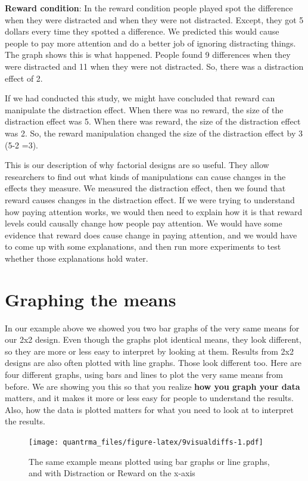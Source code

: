 \documentclass[
]{book}
\begin{document}
\textbf{Reward condition}: In the reward condition people played spot the difference when they were distracted and when they were not distracted. Except, they got 5 dollars every time they spotted a difference. We predicted this would cause people to pay more attention and do a better job of ignoring distracting things. The graph shows this is what happened. People found 9 differences when they were distracted and 11 when they were not distracted. So, there was a distraction effect of 2.

If we had conducted this study, we might have concluded that reward can manipulate the distraction effect. When there was no reward, the size of the distraction effect was 5. When there was reward, the size of the distraction effect was 2. So, the reward manipulation changed the size of the distraction effect by 3 (5-2 =3).

This is our description of why factorial designs are so useful. They allow researchers to find out what kinds of manipulations can cause changes in the effects they measure. We measured the distraction effect, then we found that reward causes changes in the distraction effect. If we were trying to understand how paying attention works, we would then need to explain how it is that reward levels could causally change how people pay attention. We would have some evidence that reward does cause change in paying attention, and we would have to come up with some explanations, and then run more experiments to test whether those explanations hold water.

\hypertarget{graphing-the-means}{%
\section{Graphing the means}\label{graphing-the-means}}

In our example above we showed you two bar graphs of the very same means for our 2x2 design. Even though the graphs plot identical means, they look different, so they are more or less easy to interpret by looking at them. Results from 2x2 designs are also often plotted with line graphs. Those look different too. Here are four different graphs, using bars and lines to plot the very same means from before. We are showing you this so that you realize \textbf{how you graph your data} matters, and it makes it more or less easy for people to understand the results. Also, how the data is plotted matters for what you need to look at to interpret the results.

\begin{figure}
\centering
\texttt{[image: quantrma\_files/figure-latex/9visualdiffs-1.pdf]}
\caption{\label{fig:9visualdiffs}The same example means plotted using bar graphs or line graphs, and with Distraction or Reward on the x-axis}
\end{figure}
\end{document}
